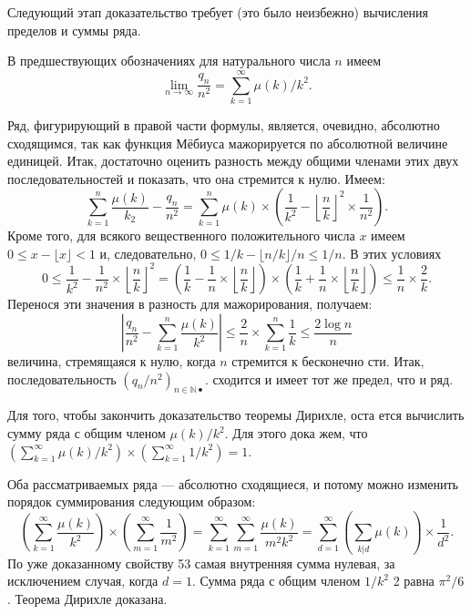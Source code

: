 \documentclass{mai_book}
\begin{document}
Следующий этап доказательство требует (это было неизбежно) вычисления пределов и суммы ряда.
\begin{lemma}
В предшествующих обозначениях для натурального числа $n$ имеем
$$\lim\limits_{n\to\infty}\frac{q_{n}}{n^2}=\sum\limits_{k=1}^{\infty}\mu(k)/k^2.$$
\end{lemma}
\begin{myproof}
Ряд, фигурирующий в правой части формулы, является, очевидно,
абсолютно сходящимся, так как функция Мёбиуса мажорируется по
абсолютной величине единицей. Итак, достаточно оценить разность
между общими членами этих двух последовательностей и показать,
что она стремится к нулю. Имеем:
\newpage
$$\sum\limits_{k=1}^{n}\frac{\mu(k)}{k_{2}}-\frac{q_{n}}{n^2}=\sum\limits_{k=1}^n\mu(k)\times \left(\frac{1}{k^2}-\left\lfloor\frac{n}{k}\right\rfloor^2\times\frac{1}{n^2}\right).$$
Кроме того, для всякого вещественного положительного числа $x$
имеем $0\leqslant x-\lfloor x\rfloor <1$ и, следовательно, $0\leqslant 1/k-\lfloor n/k\rfloor/n\leqslant 1/n$. В
этих условиях
$$0\leqslant\frac{1}{k^2}-\frac{1}{n^2}\times\left\lfloor\frac{n}{k}\right\rfloor^2=\left(\frac{1}{k}-\frac{1}{n}\times\left\lfloor\frac{n}{k}\right\rfloor\right)\times\left(\frac{1}{k}+\frac{1}{n}\times\left\lfloor\frac{n}{k}\right\rfloor\right)\leqslant\frac{1}{n}\times\frac{2}{k}.$$
Перенося эти значения в разность для мажорирования, получаем:
$$\left|\frac{q_{n}}{n^2}-\sum\limits_{k=1}^{n}\frac{\mu(k)}{k^2}\right|\leqslant\frac{2}{n}\times\sum\limits_{k=1}^{n}\frac{1}{k}\leqslant\frac{2\log n}{n}$$
величина, стремящаяся к нулю, когда $n$ стремится к бесконечно­
сти. Итак, последовательность $(q_{n}/n^2)_{n\in\mathbb{N•}}$. сходится и имеет тот же предел, что и ряд.
\end{myproof}

Для того, чтобы закончить доказательство теоремы Дирихле, оста­
ется вычислить сумму ряда с общим членом $\mu(k)/k^2$. Для этого дока­
жем, что $(\sum\nolimits_{k=1}^{\infty}\mu(k)/k^2)\times(\sum\nolimits_{k=1}^{\infty}1/k^2)=1$.

Оба рассматриваемых ряда — абсолютно сходящиеся, и потому можно изменить порядок суммирования следующим образом:
$$\left(\sum\limits_{k=1}^{\infty}\frac{\mu(k)}{k^2}\right)\times\left(\sum\limits_{m=1}^{\infty}\frac{1}{m^2}\right)=\sum\limits_{k=1}^{\infty}\sum\limits_{m=1}^{\infty}\frac{\mu(k)}{m^2 k^2}=\sum\limits_{d=1}^{\infty}\left(\sum\limits_{k|d}\mu(k)\right)\times\frac{1}{d^2}.$$
По уже доказанному свойству 53 самая внутренняя сумма нулевая, за
исключением случая, когда $d=1$. Сумма ряда с общим членом $1/k^2$ 2
равна $\pi^2/6$. Теорема Дирихле доказана.
\end{document}
